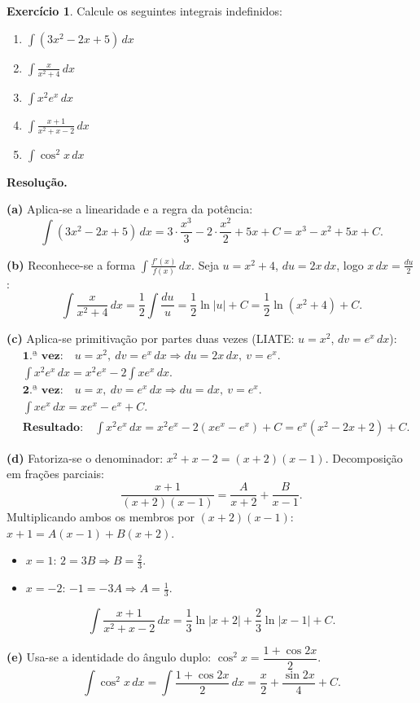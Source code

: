 \documentclass[12pt,a4paper]{article}
\theoremstyle{definition}
\newtheorem{exercise}{Exercício}[section]
\theoremstyle{remark}
\begin{document}
\begin{exercise}
  Calcule os seguintes integrais indefinidos:
  \begin{enumerate}[label=(\alph*)]
    \item $\displaystyle\int (3x^2-2x+5)\,dx$
    \item $\displaystyle\int \frac{x}{x^2+4}\,dx$
    \item $\displaystyle\int x^2 e^x\,dx$
    \item $\displaystyle\int \frac{x+1}{x^2+x-2}\,dx$
    \item $\displaystyle\int \cos^2 x\,dx$
  \end{enumerate}

  \medskip\textbf{Resolução.}

  \textbf{(a)} Aplica-se a linearidade e a regra da potência:
  \[
    \int (3x^2-2x+5)\,dx = 3\cdot\frac{x^3}{3} - 2\cdot\frac{x^2}{2} + 5x + C
    = x^3 - x^2 + 5x + C.
  \]

  \textbf{(b)} Reconhece-se a forma $\int \frac{f'(x)}{f(x)}\,dx$. Seja $u=x^2+4$,
  $du=2x\,dx$, logo $x\,dx=\frac{du}{2}$:
  \[
    \int \frac{x}{x^2+4}\,dx = \frac{1}{2}\int\frac{du}{u}
    = \frac{1}{2}\ln|u|+C = \frac{1}{2}\ln(x^2+4)+C.
  \]

  \textbf{(c)} Aplica-se primitivação por partes duas vezes (LIATE: $u=x^2$,
  $dv=e^x\,dx$):
  \begin{align*}
    &\textbf{1.ª vez:}\quad u=x^2,\ dv=e^x\,dx \Rightarrow du=2x\,dx,\ v=e^x.\\
    &\int x^2 e^x\,dx = x^2 e^x - 2\int x e^x\,dx.\\
    &\textbf{2.ª vez:}\quad u=x,\ dv=e^x\,dx \Rightarrow du=dx,\ v=e^x.\\
    &\int x e^x\,dx = xe^x - e^x + C.\\
    &\textbf{Resultado:}\quad \int x^2 e^x\,dx = x^2 e^x - 2(xe^x - e^x)+C
      = e^x(x^2-2x+2)+C.
  \end{align*}

  \textbf{(d)} Fatoriza-se o denominador: $x^2+x-2=(x+2)(x-1)$.
  Decomposição em frações parciais:
  \[
    \frac{x+1}{(x+2)(x-1)} = \frac{A}{x+2}+\frac{B}{x-1}.
  \]
  Multiplicando ambos os membros por $(x+2)(x-1)$: $x+1 = A(x-1)+B(x+2)$.
  \begin{itemize}[nosep]
    \item $x=1$: $2=3B \Rightarrow B=\tfrac{2}{3}$.
    \item $x=-2$: $-1=-3A \Rightarrow A=\tfrac{1}{3}$.
  \end{itemize}
  \[
    \int \frac{x+1}{x^2+x-2}\,dx = \frac{1}{3}\ln|x+2|+\frac{2}{3}\ln|x-1|+C.
  \]

  \textbf{(e)} Usa-se a identidade do ângulo duplo: $\cos^2 x = \dfrac{1+\cos 2x}{2}$.
  \[
    \int \cos^2 x\,dx = \int \frac{1+\cos 2x}{2}\,dx
    = \frac{x}{2} + \frac{\sin 2x}{4} + C.
  \]
\end{exercise}
\end{document}
